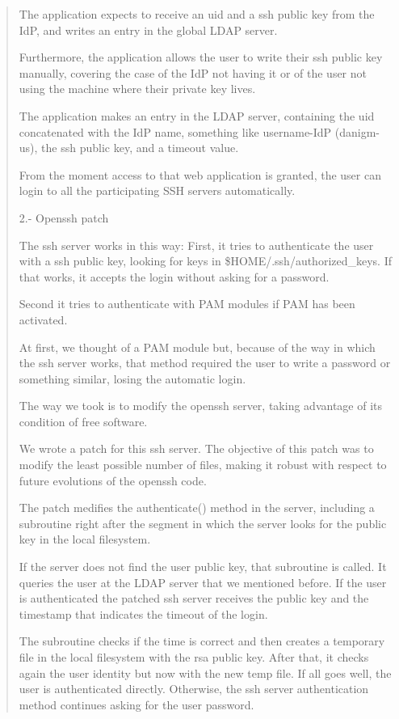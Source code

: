 \begin{quote}
    The application expects to receive an uid and a ssh public
    key from the IdP, and writes an entry in the global LDAP server.

    Furthermore, the application allows the user to write their
    ssh public key manually, covering the case of the IdP not having it
    or of the user not using the machine where their private key lives.

    The application makes an entry in the LDAP server, containing the
    uid  concatenated with the IdP name, something like username-IdP
    (danigm-us), the ssh public key, and a timeout value.

    From the moment access to that web application is granted, the user
    can login to all the participating SSH servers automatically.
    
    2.- Openssh patch
    
    The ssh server works in this way:
        First, it  tries to authenticate the user with a ssh public key,
        looking for keys in \$HOME/.ssh/authorized\_keys. If that works,
        it accepts the login without asking for a password.

        Second it tries to authenticate with PAM modules if PAM has been
        activated.

    At first, we thought of a PAM module but, because of the way in
    which the ssh server works, that method required the user to write a
    password or something similar, losing the automatic login.

    The way we took is to modify the openssh server, taking advantage of
    its condition of free software.

    We wrote a patch for this ssh server. The objective of this patch was
    to modify the least possible number of files, making it robust with respect
    to future evolutions of the openssh code.

    The patch medifies the authenticate() method in the server, including a
    subroutine right after the segment in which the server looks for the public
    key in the local filesystem. 

    If the server does not find the user public key, that subroutine is
    called. It queries the user at the LDAP server that we mentioned
    before. If the user is authenticated the patched ssh server
    receives the public key and the timestamp that indicates the
    timeout of the login.

    The subroutine checks if the time is correct and then creates a
    temporary file in the local filesystem with the rsa public key. After
    that, it checks again the user identity but now with the new temp
    file. If all goes well, the user is authenticated directly. Otherwise,
    the ssh server authentication method continues asking for the user
    password.


\end{quote}
